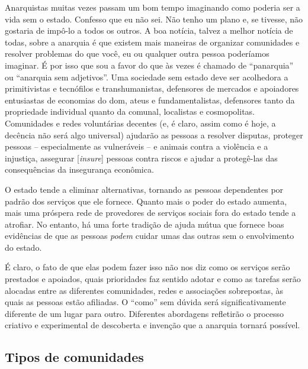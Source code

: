 Anarquistas muitas vezes passam um bom tempo imaginando como poderia ser a vida sem o estado. Confesso que eu não sei. Não tenho um plano e, se tivesse, não gostaria de impô-lo a todos os outros. A boa notícia, talvez a melhor notícia de todas, sobre a anarquia é que existem mais maneiras de organizar comunidades e resolver problemas do que você, eu ou qualquer outra pessoa poderíamos imaginar. É por isso que sou a favor do que às vezes é chamado de ``panarquia'' ou ``anarquia sem adjetivos''. Uma sociedade sem estado deve ser acolhedora a primitivistas e tecnófilos e transhumanistas, defensores de mercados e apoiadores entusiastas de economias do dom, ateus e fundamentalistas, defensores tanto da propriedade individual quanto da comunal, localistas e cosmopolitas. Comunidades e redes voluntárias decentes (e, é claro, assim como é hoje, a decência não será algo universal) ajudarão as pessoas a resolver disputas, proteger pessoas -- especialmente as vulneráveis -- e animais contra a violência e a injustiça, assegurar [\emph{insure}] pessoas contra riscos e ajudar a protegê-las das consequências da insegurança econômica.

O estado tende a eliminar alternativas, tornando as pessoas dependentes por padrão dos serviços que ele fornece. Quanto mais o poder do estado aumenta, mais uma próspera rede de provedores de serviços sociais fora do estado tende a atrofiar. No entanto, há uma forte tradição de ajuda mútua que fornece boas evidências de que as pessoas \emph{podem} cuidar umas das outras sem o envolvimento do estado.

É claro, o fato de que elas podem fazer isso não nos diz como os serviços serão prestados e apoiados, quais prioridades faz sentido adotar e como as tarefas serão alocadas entre as diferentes comunidades, redes e associações sobrepostas, às quais as pessoas estão afiliadas. O ``como'' sem dúvida será significativamente diferente de um lugar para outro. Diferentes abordagens refletirão o processo criativo e experimental de descoberta e invenção que a anarquia tornará possível.

\subsection*{Tipos de comunidades}

